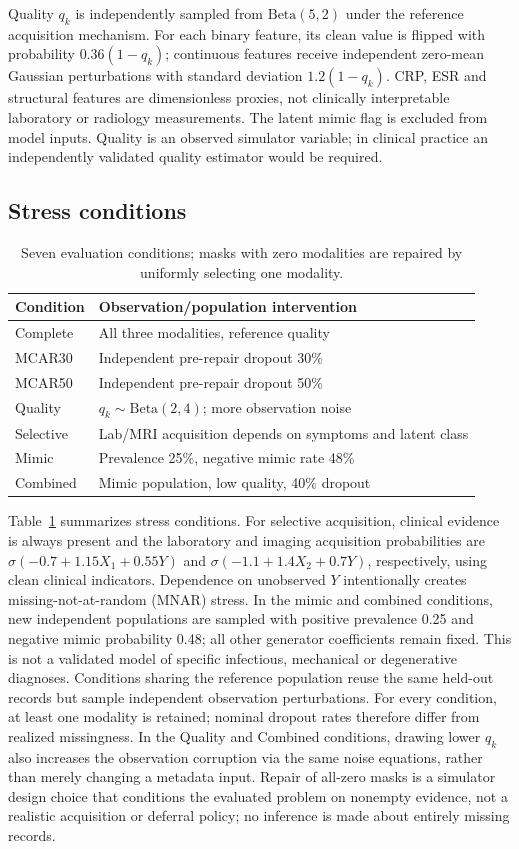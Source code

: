 \documentclass[conference]{IEEEtran}
\begin{document}
Quality $q_k$ is independently sampled from $\mathrm{Beta}(5,2)$ under the reference acquisition mechanism. For each binary feature, its clean value is flipped with probability $0.36(1-q_k)$; continuous features receive independent zero-mean Gaussian perturbations with standard deviation $1.2(1-q_k)$. CRP, ESR and structural features are dimensionless proxies, not clinically interpretable laboratory or radiology measurements. The latent mimic flag is excluded from model inputs. Quality is an observed simulator variable; in clinical practice an independently validated quality estimator would be required.
\subsection{Stress conditions}
\begin{table}[t]
\caption{Seven evaluation conditions; masks with zero modalities are repaired by uniformly selecting one modality.}
\label{tab:scen}
\centering\footnotesize
\begin{tabular}{@{}p{}p{}@{}}\toprule
Condition & Observation/population intervention\\\midrule
Complete & All three modalities, reference quality\\
MCAR30 & Independent pre-repair dropout 30\%\\
MCAR50 & Independent pre-repair dropout 50\%\\
Quality & $q_k\sim\mathrm{Beta}(2,4)$; more observation noise\\
Selective & Lab/MRI acquisition depends on symptoms and latent class\\
Mimic & Prevalence 25\%, negative mimic rate 48\%\\
Combined & Mimic population, low quality, 40\% dropout\\\bottomrule
\end{tabular}
\end{table}
Table~\ref{tab:scen} summarizes stress conditions. For selective acquisition, clinical evidence is always present and the laboratory and imaging acquisition probabilities are $\sigma(-0.7+1.15X_1+0.55Y)$ and $\sigma(-1.1+1.4X_2+0.7Y)$, respectively, using clean clinical indicators. Dependence on unobserved $Y$ intentionally creates missing-not-at-random (MNAR) stress. In the mimic and combined conditions, new independent populations are sampled with positive prevalence 0.25 and negative mimic probability 0.48; all other generator coefficients remain fixed. This is not a validated model of specific infectious, mechanical or degenerative diagnoses. Conditions sharing the reference population reuse the same held-out records but sample independent observation perturbations. For every condition, at least one modality is retained; nominal dropout rates therefore differ from realized missingness. In the Quality and Combined conditions, drawing lower $q_k$ also increases the observation corruption via the same noise equations, rather than merely changing a metadata input. Repair of all-zero masks is a simulator design choice that conditions the evaluated problem on nonempty evidence, not a realistic acquisition or deferral policy; no inference is made about entirely missing records.
\end{document}
